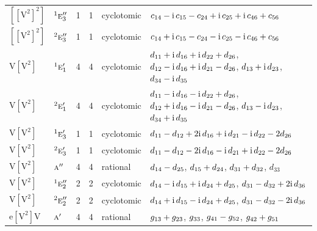 \documentclass[10pt,a4paper]{article}
\numberwithin{equation}{section}
\newcommand{\irr}[1]{\text{\normalfont\scshape #1}}
\newcommand{\conjpair}[1]{{}^{#1}}
\newcommand{\iunit}{\mathrm{i}}
\newcommand{\jahn}[1]{\mathrm{#1}}
\newlength{\fillwidth}\newlength{\cellwidth}\newlength{\colwidth}
\newcommand{\signbreak}{\penalty100\relax}
\begin{document}
{\begin{longtable}{@{}llrrl>{\RaggedRight\arraybackslash}p{\fillwidth}@{}}
$\jahn{[[V^{2}]^{2}]}$ & $\conjpair{1}\irr{e}_{3}''$ & 1 & 1 & cyclotomic & $c_{14} -\signbreak \iunit{}\,c_{15} -\signbreak c_{24} +\signbreak \iunit{}\,c_{25} +\signbreak \iunit{}\,c_{46} +\signbreak c_{56}$\\
$\jahn{[[V^{2}]^{2}]}$ & $\conjpair{2}\irr{e}_{3}''$ & 1 & 1 & cyclotomic & $c_{14} +\signbreak \iunit{}\,c_{15} -\signbreak c_{24} -\signbreak \iunit{}\,c_{25} -\signbreak \iunit{}\,c_{46} +\signbreak c_{56}$\\
$\jahn{V[V^{2}]}$ & $\conjpair{1}\irr{e}_{1}'$ & 4 & 4 & cyclotomic & $d_{11} +\signbreak \iunit{}\,d_{16} +\signbreak \iunit{}\,d_{22} +\signbreak d_{26}$, $d_{12} -\signbreak \iunit{}\,d_{16} +\signbreak \iunit{}\,d_{21} -\signbreak d_{26}$, $d_{13} +\signbreak \iunit{}\,d_{23}$, $d_{34} -\signbreak \iunit{}\,d_{35}$\\
$\jahn{V[V^{2}]}$ & $\conjpair{2}\irr{e}_{1}'$ & 4 & 4 & cyclotomic & $d_{11} -\signbreak \iunit{}\,d_{16} -\signbreak \iunit{}\,d_{22} +\signbreak d_{26}$, $d_{12} +\signbreak \iunit{}\,d_{16} -\signbreak \iunit{}\,d_{21} -\signbreak d_{26}$, $d_{13} -\signbreak \iunit{}\,d_{23}$, $d_{34} +\signbreak \iunit{}\,d_{35}$\\
$\jahn{V[V^{2}]}$ & $\conjpair{1}\irr{e}_{3}'$ & 1 & 1 & cyclotomic & $d_{11} -\signbreak d_{12} +\signbreak 2\iunit{}\,d_{16} +\signbreak \iunit{}\,d_{21} -\signbreak \iunit{}\,d_{22} -\signbreak 2d_{26}$\\
$\jahn{V[V^{2}]}$ & $\conjpair{2}\irr{e}_{3}'$ & 1 & 1 & cyclotomic & $d_{11} -\signbreak d_{12} -\signbreak 2\iunit{}\,d_{16} -\signbreak \iunit{}\,d_{21} +\signbreak \iunit{}\,d_{22} -\signbreak 2d_{26}$\\
$\jahn{V[V^{2}]}$ & $\irr{a}''$ & 4 & 4 & rational & $d_{14} -\signbreak d_{25}$, $d_{15} +\signbreak d_{24}$, $d_{31} +\signbreak d_{32}$, $d_{33}$\\
$\jahn{V[V^{2}]}$ & $\conjpair{1}\irr{e}_{2}''$ & 2 & 2 & cyclotomic & $d_{14} -\signbreak \iunit{}\,d_{15} +\signbreak \iunit{}\,d_{24} +\signbreak d_{25}$, $d_{31} -\signbreak d_{32} +\signbreak 2\iunit{}\,d_{36}$\\
$\jahn{V[V^{2}]}$ & $\conjpair{2}\irr{e}_{2}''$ & 2 & 2 & cyclotomic & $d_{14} +\signbreak \iunit{}\,d_{15} -\signbreak \iunit{}\,d_{24} +\signbreak d_{25}$, $d_{31} -\signbreak d_{32} -\signbreak 2\iunit{}\,d_{36}$\\
$\jahn{e[V^{2}]V}$ & $\irr{a}'$ & 4 & 4 & rational & $\mathnormal{g}_{13} +\signbreak \mathnormal{g}_{23}$, $\mathnormal{g}_{33}$, $\mathnormal{g}_{41} -\signbreak \mathnormal{g}_{52}$, $\mathnormal{g}_{42} +\signbreak \mathnormal{g}_{51}$\\

\end{longtable}}
\end{document}
